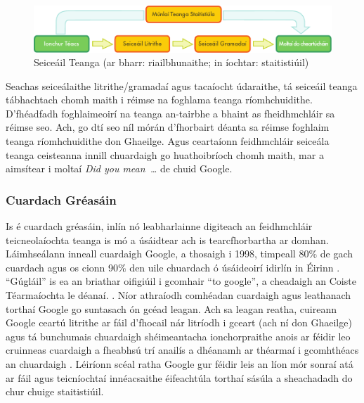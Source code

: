 \begin{multicols}{2}
\begin{figure}[htb]
  \center
  \includegraphics[width=\textwidth]{../_media/irish/language_checking}
  \caption{Seiceáil Teanga (ar bharr: riailbhunaithe; in íochtar: staitistiúil)}
  \label{fig:langcheckingaarch_de}
\end{figure}


Seachas seiceálaithe litrithe/gramadaí agus tacaíocht údaraithe, tá seiceáil teanga tábhachtach chomh maith i réimse na foghlama teanga ríomhchuidithe. D’fhéadfadh foghlaimeoirí na teanga an-tairbhe a bhaint as fheidhmchláir sa réimse seo. Ach, go dtí seo níl mórán d’fhorbairt déanta sa réimse foghlaim teanga ríomhchuidithe don Ghaeilge. Agus ceartaíonn feidhmchláir seiceála teanga ceisteanna innill chuardaigh go huathoibríoch chomh maith, mar a aimsítear i moltaí \textit{Did you mean~\dots} de chuid Google.

\subsubsection{Cuardach Gréasáin}

Is é cuardach gréasáin, inlín nó leabharlainne digiteach an feidhmchláir teicneolaíochta teanga is mó a úsáidtear ach is tearcfhorbartha ar domhan. Láimhseálann inneall cuardaigh Google, a thosaigh i 1998, timpeall 80\% de gach cuardach agus os cionn 90\% den uile chuardach ó úsáideoirí idirlín in Éirinn \cite{googlemarketshare}.  ``Gúgláil'' is ea an briathar oifigiúil i gcomhair ``to google'', a cheadaigh an Coiste Téarmaíochta le déanaí. \cite{kilgarriff2010}.  Níor athraíodh comhéadan cuardaigh agus leathanach torthaí Google go suntasach ón gcéad leagan. Ach sa leagan reatha, cuireann Google ceartú litrithe ar fáil d’fhocail nár litríodh i gceart (ach ní don Ghaeilge) agus tá bunchumais chuardaigh shéimeantacha ionchorpraithe anois ar féidir leo cruinneas cuardaigh a fheabhsú trí anailís a dhéanamh ar théarmaí i gcomhthéacs an chuardaigh \cite{googlesemsearch}. Léiríonn scéal ratha Google gur féidir leis an líon mór sonraí atá ar fáil agus teicníochtaí innéacsaithe éifeachtúla torthaí sásúla a sheachadadh do chur chuige staitistiúil. 


\end{multicols}
